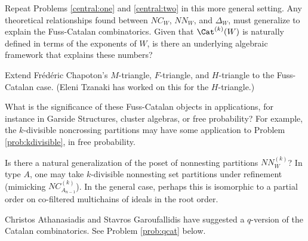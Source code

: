 \begin{problemblock} 	\begin{problem}[1.5]
Repeat Problems \ref{central:one} and \ref{central:two} in this more general setting. Any theoretical relationships found between $NC_W$, $NN_W$, and $\Delta_W$, must generalize to explain the Fuss-Catalan combinatorics. Given that $\Cat^{(k)}(W)$ is naturally defined in terms of the exponents of $W$, is there an underlying algebraic framework that explains these numbers?
\end{problem}

\begin{remark}
Extend Fr\'ed\'eric Chapoton's $M$-triangle, $F$-triangle, and $H$-triangle to the Fuss-Catalan case. (Eleni Tzanaki has worked on this for the $H$-triangle.)
\end{remark}

\begin{remark}
What is the significance of these Fuss-Catalan objects in applications, for instance in Garside Structures, cluster algebras, or free probability? For example, the $k$-divisible noncrossing partitions may have some application to Problem \ref{prob:kdivisible}, in free probability.
\end{remark}

\begin{remark}
Is there a natural generalization of the poset of nonnesting partitions $NN^{(k)}_W$? In type $A$, one may take $k$-divisible nonnesting set partitions under refinement (mimicking $NC_{A_{n-1}}^{(k)}$). In the general case, perhaps this is isomorphic to a partial order on co-filtered multichains of ideals in the root order.
\end{remark}

\begin{remark}
Christos Athanasiadis and Stavros Garoufallidis have suggested a $q$-version of the Catalan combinatorics. See Problem \ref{prob:qcat} below.
\end{remark}

\end{problemblock}
